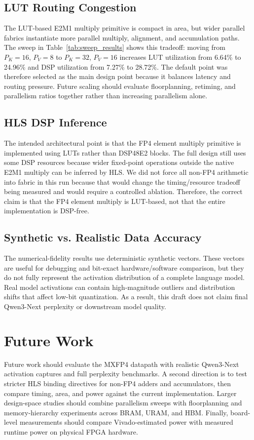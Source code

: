 \documentclass[conference]{IEEEtran}
\begin{document}
\subsection{LUT Routing Congestion}
The LUT-based E2M1 multiply primitive is compact in area, but wider parallel fabrics instantiate more parallel multiply, alignment, and accumulation paths. The sweep in Table~\ref{tab:sweep_results} shows this tradeoff: moving from $P_K=16$, $P_V=8$ to $P_K=32$, $P_V=16$ increases LUT utilization from 6.64\% to 24.96\% and DSP utilization from 7.27\% to 28.72\%. The default point was therefore selected as the main design point because it balances latency and routing pressure. Future scaling should evaluate floorplanning, retiming, and parallelism ratios together rather than increasing parallelism alone.

\subsection{HLS DSP Inference}
The intended architectural point is that the FP4 element multiply primitive is implemented using LUTs rather than DSP48E2 blocks. The full design still uses some DSP resources because wider fixed-point operations outside the native E2M1 multiply can be inferred by HLS. We did not force all non-FP4 arithmetic into fabric in this run because that would change the timing/resource tradeoff being measured and would require a controlled ablation. Therefore, the correct claim is that the FP4 element multiply is LUT-based, not that the entire implementation is DSP-free.

\subsection{Synthetic vs. Realistic Data Accuracy}
The numerical-fidelity results use deterministic synthetic vectors. These vectors are useful for debugging and bit-exact hardware/software comparison, but they do not fully represent the activation distribution of a complete language model. Real model activations can contain high-magnitude outliers and distribution shifts that affect low-bit quantization. As a result, this draft does not claim final Qwen3-Next perplexity or downstream model quality.

\section{Future Work}
Future work should evaluate the MXFP4 datapath with realistic Qwen3-Next activation captures and full perplexity benchmarks. A second direction is to test stricter HLS binding directives for non-FP4 adders and accumulators, then compare timing, area, and power against the current implementation. Larger design-space studies should combine parallelism sweeps with floorplanning and memory-hierarchy experiments across BRAM, URAM, and HBM. Finally, board-level measurements should compare Vivado-estimated power with measured runtime power on physical FPGA hardware.
\end{document}
